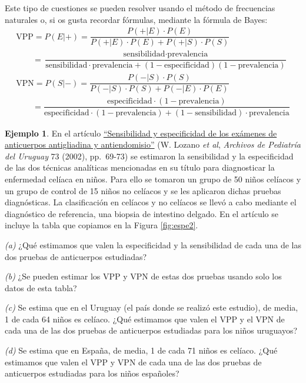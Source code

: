 \documentclass[
]{book}
\theoremstyle{definition}
\theoremstyle{definition}
\newtheorem{example}{Ejemplo}[chapter]
\theoremstyle{definition}
\theoremstyle{definition}
\theoremstyle{remark}
\begin{document}
Este tipo de cuestiones se pueden resolver usando el método de frecuencias naturales o, si os gusta recordar fórmulas, mediante la fórmula de Bayes:
\[
\begin{array}{l}
\text{VPP} = P(E|+) =\dfrac{P(+|E)\cdot P(E)}{P(+|E)\cdot P(E)+P(+|S)\cdot P(S)}\\
\qquad =\dfrac{\text{sensibilidad}\cdot \text{prevalencia}}{\text{sensibilidad}\cdot \text{prevalencia}+(1-\text{especificidad})(1-\text{prevalencia})}\\[2ex]
\text{VPN} = P(S|-)=\dfrac{P(-|S)\cdot P(S)}{P(-|S)\cdot P(S)+P(-|E)\cdot P(E)}\\
\qquad =\dfrac{\text{especificidad}\cdot (1-\text{prevalencia})}{\text{especificidad}\cdot (1-\text{prevalencia})+(1-\text{sensibilidad})\cdot\text{prevalencia}}
\end{array}
\]

\begin{example}
\protect\hypertarget{exm:antiendomisio}{}\label{exm:antiendomisio}En el artículo \href{http://www.scielo.edu.uy/scielo.php?pid=S1688-12492002000200003\&script=sci_arttext\&tlng=en}{``Sensibilidad y especificidad de los exámenes de anticuerpos antigliadina y antiendomisio''} (W. Lozano \emph{et al}, \emph{Archivos de Pediatría del Uruguay} 73 (2002), pp.~69-73) se estimaron la sensibilidad y la especificidad de las dos técnicas analíticas mencionadas en su título para diagnosticar la enfermedad celíaca en niños. Para ello se tomaron un grupo de 50 niños celíacos y un grupo de control de 15 niños no celíacos y se les aplicaron dichas pruebas diagnósticas. La clasificación en celíacos y no celíacos se llevó a cabo mediante el diagnóstico de referencia, una biopsia de intestino delgado. En el artículo se incluye la tabla que copiamos en la Figura \ref{fig:espe2}.

\emph{(a)} ¿Qué estimamos que valen la especificidad y la sensibilidad de cada una de las dos pruebas de anticuerpos estudiadas?

\emph{(b)} ¿Se pueden estimar los VPP y VPN de estas dos pruebas usando solo los datos de esta tabla?

\emph{(c)} Se estima que en el Uruguay (el país donde se realizó este estudio), de media, 1 de cada 64 niños es celíaco. ¿Qué estimamos que valen el VPP y el VPN de cada una de las dos pruebas de anticuerpos estudiadas para los niños uruguayos?

\emph{(d)} Se estima que en España, de media, 1 de cada 71 niños es celíaco. ¿Qué estimamos que valen el VPP y VPN de cada una de las dos pruebas de anticuerpos estudiadas para los niños españoles?
\end{example}
\end{document}
